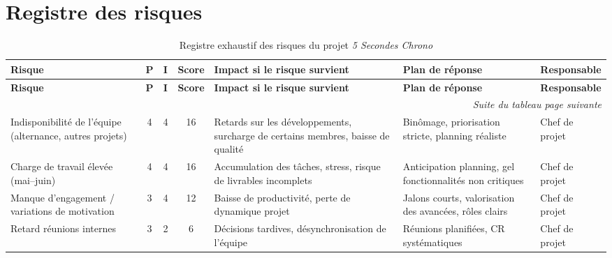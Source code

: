 \chapter{Registre des risques} \label{annexe:matrice-risque}

\renewcommand{\arraystretch}{1.3}

\begin{longtable}{|p{3cm}|c|c|c|p{4.1cm}|p{4.1cm}|p{2.3cm}|}
\caption{Registre exhaustif des risques du projet \emph{5 Secondes Chrono}}
\label{tab:risqueglob} \\

\hline
\rowcolor{etnaBlue!30}
\textbf{Risque} & \textbf{P} & \textbf{I} & \textbf{Score}
& \textbf{Impact si le risque survient}
& \textbf{Plan de réponse}
& \textbf{Responsable} \\
\hline
\endfirsthead

\hline
\rowcolor{etnaBlue!15}
\textbf{Risque} & \textbf{P} & \textbf{I} & \textbf{Score}
& \textbf{Impact si le risque survient}
& \textbf{Plan de réponse}
& \textbf{Responsable} \\
\hline
\endhead

\hline
\multicolumn{7}{r}{\textit{Suite du tableau page suivante}} \\
\endfoot

\hline
\endlastfoot

Indisponibilité de l’équipe (alternance, autres projets)
& 4 & 4 & 16
& Retards sur les développements, surcharge de certains membres, baisse de qualité
& Binômage, priorisation stricte, planning réaliste
& Chef de projet \\ \hline

Charge de travail élevée (mai--juin)
& 4 & 4 & 16
& Accumulation des tâches, stress, risque de livrables incomplets
& Anticipation planning, gel fonctionnalités non critiques
& Chef de projet \\ \hline

Manque d’engagement / variations de motivation
& 3 & 4 & 12
& Baisse de productivité, perte de dynamique projet
& Jalons courts, valorisation des avancées, rôles clairs
& Chef de projet \\ \hline

Retard réunions internes
& 3 & 2 & 6
& Décisions tardives, désynchronisation de l’équipe
& Réunions planifiées, CR systématiques
& Chef de projet \\ \hline


\end{longtable}
